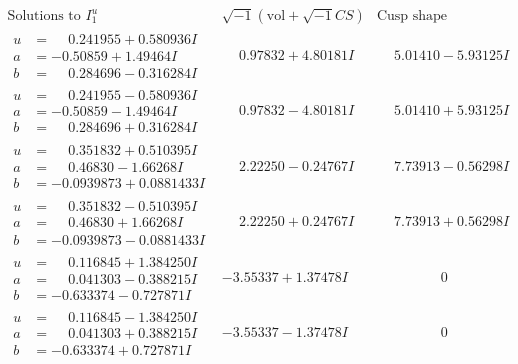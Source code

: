 \documentclass[1p]{elsarticle_modified}
\theoremstyle{definition}
\newcommand{\I}{\sqrt{-1}}
\begin{document}
$$\begin{array}{c|c|c}
\text{Solutions to }I^u_{1}& \I (\text{vol} + \sqrt{-1}CS) & \text{Cusp shape}\\
 \hline 
\begin{aligned}
u &= \phantom{-}0.241955 + 0.580936 I \\
a &= -0.50859 + 1.49464 I \\
b &= \phantom{-}0.284696 - 0.316284 I\end{aligned}
 & \phantom{-}0.97832 + 4.80181 I & \phantom{-}5.01410 - 5.93125 I \\ \hline\begin{aligned}
u &= \phantom{-}0.241955 - 0.580936 I \\
a &= -0.50859 - 1.49464 I \\
b &= \phantom{-}0.284696 + 0.316284 I\end{aligned}
 & \phantom{-}0.97832 - 4.80181 I & \phantom{-}5.01410 + 5.93125 I \\ \hline\begin{aligned}
u &= \phantom{-}0.351832 + 0.510395 I \\
a &= \phantom{-}0.46830 - 1.66268 I \\
b &= -0.0939873 + 0.0881433 I\end{aligned}
 & \phantom{-}2.22250 - 0.24767 I & \phantom{-}7.73913 - 0.56298 I \\ \hline\begin{aligned}
u &= \phantom{-}0.351832 - 0.510395 I \\
a &= \phantom{-}0.46830 + 1.66268 I \\
b &= -0.0939873 - 0.0881433 I\end{aligned}
 & \phantom{-}2.22250 + 0.24767 I & \phantom{-}7.73913 + 0.56298 I \\ \hline\begin{aligned}
u &= \phantom{-}0.116845 + 1.384250 I \\
a &= \phantom{-}0.041303 - 0.388215 I \\
b &= -0.633374 - 0.727871 I\end{aligned}
 & -3.55337 + 1.37478 I & \phantom{-0.000000 } 0 \\ \hline\begin{aligned}
u &= \phantom{-}0.116845 - 1.384250 I \\
a &= \phantom{-}0.041303 + 0.388215 I \\
b &= -0.633374 + 0.727871 I\end{aligned}
 & -3.55337 - 1.37478 I & \phantom{-0.000000 } 0 \\ \hline\begin{aligned}

\end{aligned}
\end{array}$$
\end{document}
